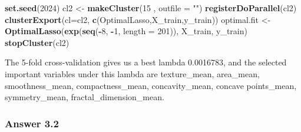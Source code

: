 \documentclass[
]{article}
\newenvironment{Shaded}{\begin{snugshade}}{\end{snugshade}}
\newcommand{\AttributeTok}[1]{\textcolor[rgb]{0.13,0.29,0.53}{#1}}
\newcommand{\DecValTok}[1]{\textcolor[rgb]{0.00,0.00,0.81}{#1}}
\newcommand{\FunctionTok}[1]{\textcolor[rgb]{0.13,0.29,0.53}{\textbf{#1}}}
\newcommand{\NormalTok}[1]{#1}
\newcommand{\OtherTok}[1]{\textcolor[rgb]{0.56,0.35,0.01}{#1}}
\newcommand{\SpecialCharTok}[1]{\textcolor[rgb]{0.81,0.36,0.00}{\textbf{#1}}}
\newcommand{\StringTok}[1]{\textcolor[rgb]{0.31,0.60,0.02}{#1}}
\begin{document}
\begin{Shaded}
\begin{Highlighting}[]
\FunctionTok{set.seed}\NormalTok{(}\DecValTok{2024}\NormalTok{)}
\NormalTok{cl2 }\OtherTok{\textless{}{-}} \FunctionTok{makeCluster}\NormalTok{(}\DecValTok{15}\NormalTok{ , }\AttributeTok{outfile =} \StringTok{""}\NormalTok{)}
\FunctionTok{registerDoParallel}\NormalTok{(cl2)}
\FunctionTok{clusterExport}\NormalTok{(}\AttributeTok{cl=}\NormalTok{cl2, }\FunctionTok{c}\NormalTok{(}\StringTok{\textquotesingle{}OptimalLasso\textquotesingle{}}\NormalTok{,}\StringTok{\textquotesingle{}X\_train\textquotesingle{}}\NormalTok{,}\StringTok{\textquotesingle{}y\_train\textquotesingle{}}\NormalTok{))}
\NormalTok{optimal.fit }\OtherTok{\textless{}{-}} \FunctionTok{OptimalLasso}\NormalTok{(}\FunctionTok{exp}\NormalTok{(}\FunctionTok{seq}\NormalTok{(}\SpecialCharTok{{-}}\DecValTok{8}\NormalTok{, }\SpecialCharTok{{-}}\DecValTok{1}\NormalTok{, }\AttributeTok{length =} \DecValTok{201}\NormalTok{)), X\_train, y\_train)}
\FunctionTok{stopCluster}\NormalTok{(cl2)}
\end{Highlighting}
\end{Shaded}

The 5-fold cross-validation gives us a best lambda 0.0016783, and the
selected important variables under this lambda are texture\_mean,
area\_mean, smoothness\_mean, compactness\_mean, concavity\_mean,
concave points\_mean, symmetry\_mean, fractal\_dimension\_mean.

\hypertarget{answer-3.2}{%
\subsubsection{Answer 3.2}\label{answer-3.2}}
\end{document}
